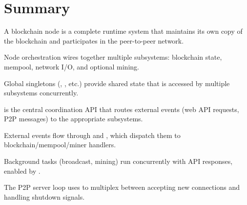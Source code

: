 \section{Summary}
\label{sec:ch09-8-summary}

\begin{chaptersummary}
  \item A blockchain node is a complete runtime system that maintains its own copy of the blockchain and participates in the peer-to-peer network.
  \item Node orchestration wires together multiple subsystems: blockchain state, mempool, network I/O, and optional mining.
  \item Global singletons (, , etc.) provide shared state that is accessed by multiple subsystems concurrently.
  \item {} is the central coordination API that routes external events (web API requests, P2P messages) to the appropriate subsystems.
  \item External events flow through  and , which dispatch them to blockchain/mempool/miner handlers.
  \item Background tasks (broadcast, mining) run concurrently with API responses, enabled by .
  \item The P2P server loop uses  to multiplex between accepting new connections and handling shutdown signals.
\end{chaptersummary}
